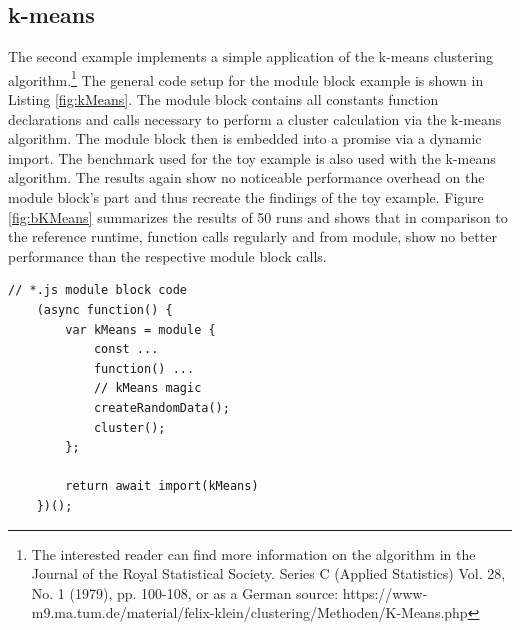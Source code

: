 \subsection{k-means}
The second example implements a simple application of the k-means clustering algorithm.\footnote{The interested reader can find more information on the algorithm in the Journal of the Royal Statistical Society. Series C (Applied Statistics) Vol. 28, No. 1 (1979), pp. 100-108, or as a German source:  https://www-m9.ma.tum.de/material/felix-klein/clustering/Methoden/K-Means.php}
The general code setup for the module block example is shown in Listing \ref{fig:kMeans}. The module block contains all constants function declarations and calls necessary to perform a cluster calculation via the k-means algorithm. The module block then is embedded into a promise via a dynamic import. The benchmark used for the toy example is also used with the k-means algorithm. The results again show no noticeable performance overhead on the module block's part and thus recreate the findings of the toy example. Figure \ref{fig:bKMeans} summarizes the results of 50 runs and shows that in comparison to the reference runtime, function calls regularly and from module, show no better performance than the respective module block calls.

\begin{lstlisting}[caption={Module block toy example}, label={fig:kMeans}]
    // *.js module block code
    (async function() {
        var kMeans = module {
            const ...
            function() ...
            // kMeans magic
            createRandomData();
            cluster();
        };
        
        return await import(kMeans)
    })();
\end{lstlisting}

